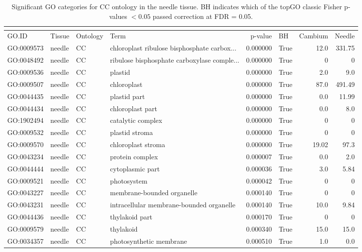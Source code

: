 \begin{longtable}{llllrlrr}
\caption{Significant GO categories for CC ontology in the needle tissue. BH indicates which of the topGO classic Fisher p-values $< 0.05$ passed correction at FDR = 0.05.}\\
\label{tab:go-needle-CC}\\
\toprule
GO.ID & Tissue & Ontology & Term & p-value & BH & Cambium & Needle \\
\midrule
GO:0009573 & needle & CC &   chloroplast ribulose bisphosphate carbox...  & 0.000000 &   True  & 12.0 & 331.75 \\ 
GO:0048492 & needle & CC &   ribulose bisphosphate carboxylase comple...  & 0.000000 &   True  & 0 & 0 \\
GO:0009536 & needle & CC &   plastid  & 0.000000 &   True  & 2.0 & 9.0 \\ 
GO:0009507 & needle & CC &   chloroplast  & 0.000000 &   True  & 87.0 & 491.49 \\ 
GO:0044435 & needle & CC &   plastid part  & 0.000000 &   True  & 0.0 & 11.99 \\ 
GO:0044434 & needle & CC &   chloroplast part  & 0.000000 &   True  & 0.0 & 8.0 \\ 
GO:1902494 & needle & CC &   catalytic complex  & 0.000000 &   True  & 0 & 0 \\
GO:0009532 & needle & CC &   plastid stroma  & 0.000000 &   True  & 0 & 0 \\
GO:0009570 & needle & CC &   chloroplast stroma  & 0.000000 &   True  & 19.02 & 97.3 \\ 
GO:0043234 & needle & CC &   protein complex  & 0.000007 &   True  & 0.0 & 2.0 \\ 
GO:0044444 & needle & CC &   cytoplasmic part  & 0.000036 &   True  & 3.0 & 5.84 \\ 
GO:0009521 & needle & CC &   photosystem  & 0.000042 &   True  & 0 & 0 \\
GO:0043227 & needle & CC &   membrane-bounded organelle  & 0.000140 &   True  & 0 & 0 \\
GO:0043231 & needle & CC &   intracellular membrane-bounded organelle  & 0.000140 &   True  & 10.0 & 9.84 \\ 
GO:0044436 & needle & CC &   thylakoid part  & 0.000170 &   True  & 0 & 0 \\
GO:0009579 & needle & CC &   thylakoid  & 0.000340 &   True  & 15.0 & 15.0 \\ 
GO:0034357 & needle & CC &   photosynthetic membrane  & 0.000510 &   True  & 1.0 & 0.0 \\ 

\end{longtable}
